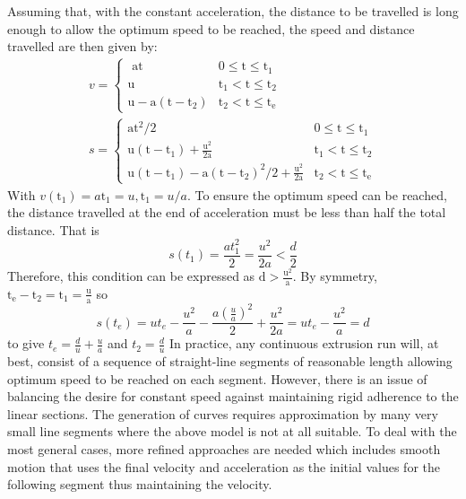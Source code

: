 \documentclass{UoNMCHA}
\numberwithin{equation}{section}
\begin{document}
	
	Assuming that, with the constant acceleration, the distance to be travelled is long enough to allow the
	optimum speed to be reached, the speed and distance travelled are then given by:
	$$
	\begin{array}{c}
	v=\left\{\begin{array}{cc}
	\text { at } & 0 \leq \mathrm{t} \leq \mathrm{t}_{1} \\
	\mathrm{u} & \mathrm{t}_{1}<\mathrm{t} \leq \mathrm{t}_{2} \\
	\mathrm{u}-\mathrm{a}\left(\mathrm{t}-\mathrm{t}_{2}\right) & \mathrm{t}_{2}<\mathrm{t} \leq \mathrm{t}_{\mathrm{e}}
	\end{array}\right. \\
	s=\left\{\begin{array}{cc}
	\mathrm{at}^{2} / 2 & 0 \leq \mathrm{t} \leq \mathrm{t}_{1} \\
	\mathrm{u}\left(\mathrm{t}-\mathrm{t}_{1}\right)+\frac{\mathrm{u}^{2}}{2 \mathrm{a}} & \mathrm{t}_{1}<\mathrm{t} \leq \mathrm{t}_{2} \\
	\mathrm{u}\left(\mathrm{t}-\mathrm{t}_{1}\right)-\mathrm{a}\left(\mathrm{t}-\mathrm{t}_{2}\right)^{2} / 2+\frac{\mathrm{u}^{2}}{2 \mathrm{a}} & \mathrm{t}_{2}<\mathrm{t} \leq \mathrm{t}_{\mathrm{e}}
	\end{array}\right.
	\end{array}
	$$
	With $v\left(\mathrm{t}_{1}\right)=a \mathrm{t}_{1}=u, \mathrm{t}_{1}=u / a .$ To ensure the optimum speed can be reached, the distance travelled
	at the end of acceleration must be less than half the total distance. That is
	$$
	s\left(t_{1}\right)=\frac{a t_{1}^{2}}{2}=\frac{u^{2}}{2 a}<\frac{d}{2}
	$$
	Therefore, this condition can be expressed as $\mathrm{d}>\frac{\mathrm{u}^{2}}{\mathrm{a}} .$ By symmetry, $\mathrm{t}_{\mathrm{e}}-\mathrm{t}_{2}=\mathrm{t}_{1}=\frac{\mathrm{u}}{\mathrm{a}}$ so
	$$
	s\left(t_{e}\right)=u t_{e}-\frac{u^{2}}{a}-\frac{a\left(\frac{u}{a}\right)^{2}}{2}+\frac{u^{2}}{2 a}=u t_{e}-\frac{u^{2}}{a}=d
	$$
	to give $t_{e}=\frac{d}{u}+\frac{u}{a}$ and $t_{2}=\frac{d}{u}$
	In practice, any continuous extrusion run will, at best, consist of a sequence of straight-line segments
	of reasonable length allowing optimum speed to be reached on each segment. However, there is an
	issue of balancing the desire for constant speed against maintaining rigid adherence to the linear
	sections. The generation of curves requires approximation by many very small line segments where the
	above model is not at all suitable. To deal with the most general cases, more refined approaches are
	needed which includes smooth motion that uses the final velocity and acceleration as the initial values
	for the following segment thus maintaining the velocity.
	
\end{document}
